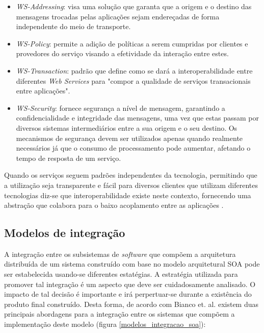 \begin{itemize}
\item \textit{WS-Addressing}: visa uma solução que garanta que a origem e o destino das mensagens trocadas pelas aplicações sejam endereçadas de forma independente do meio de transporte.
\item \textit{WS-Policy}: permite a adição de políticas a serem cumpridas por clientes e provedores do serviço visando a efetividade da interação entre estes.
\item \textit{WS-Transaction}: padrão que define como se dará a interoperabilidade entre diferentes \textit{Web Services} para "compor a qualidade de serviços transacionais entre aplicações".
\item \textit{WS-Security}: fornece segurança a nível de mensagem, garantindo a confidencialidade e integridade das mensagens, uma vez que estas passam por diversos sistemas intermediários entre a sua origem e o seu destino. Os mecanismos de segurança devem ser utilizados apenas quando realmente necessários já que o consumo de processamento pode aumentar, afetando o tempo de resposta de um serviço.
\end{itemize}

Quando os serviços seguem padrões independentes da tecnologia, permitindo que a utilização seja transparente e fácil para diversos clientes que utilizam diferentes tecnologias diz-se que interoperabilidade existe neste contexto, fornecendo uma abstração que colabora para o baixo acoplamento entre as aplicações \cite{oliveira_interoperabilidade}.

\subsection{Modelos de integração}
A integração entre os subsistemas de \textit{software} que compõem a arquitetura distribuída de um sistema construído com base no modelo arquitetural SOA pode ser estabelecida usando-se diferentes estatégias. A estratégia utilizada para promover tal integração é um aspecto que deve ser cuidadosamente analisado. O impacto de tal decisão é importante e irá perpertuar-se durante a existência do produto final construído. Desta forma, de acordo com Bianco et. al. \cite{Bianco2007} existem duas principais abordagens para a integração entre os sistemas que compõem a implementação deste modelo (figura \ref{modelos_integracao_soa}):

